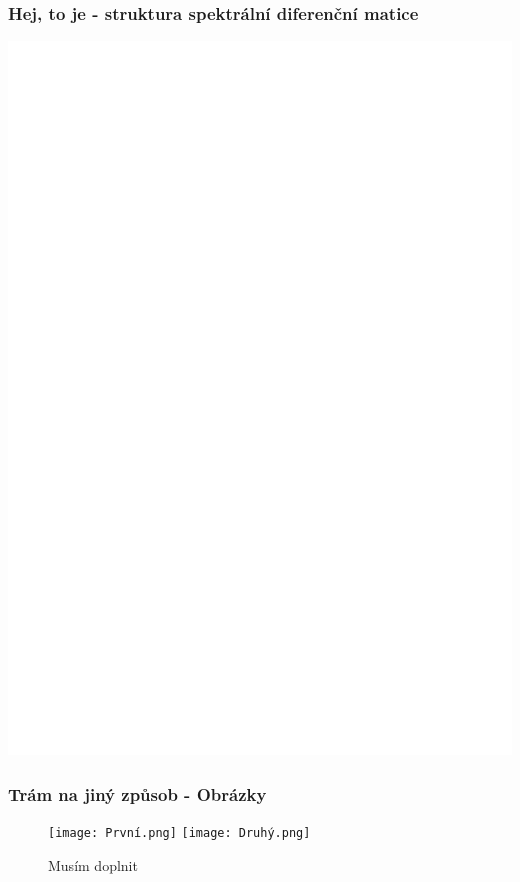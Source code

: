 \documentclass[xcolor=table]{beamer}
\begin{document}
\begin{frame}
\frametitle{Hej, to je - struktura spektrální diferenční matice}
\centering
\includegraphics[scale=0.5]{d-matrix-chebyshev-structure}   
\end{frame}
                
\begin{frame}
\frametitle{Trám na jiný způsob - Obrázky}
\centering
\begin{figure}
\texttt{[image: První.png]}
\texttt{[image: Druhý.png]}
\caption{Musím doplnit}
\end{figure}
\end{frame}
\end{document}
